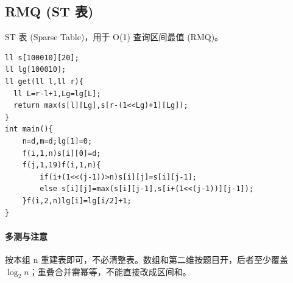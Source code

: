\subsection{RMQ (ST 表)}
ST 表 (Sparse Table)，用于 O(1) 查询区间最值 (RMQ)。
\begin{lstlisting}
ll s[100010][20];
ll lg[100010];
ll get(ll l,ll r){
  ll L=r-l+1,Lg=lg[L];
  return max(s[l][Lg],s[r-(1<<Lg)+1][Lg]);
}
int main(){
	n=d,m=d;lg[1]=0;
	f(i,1,n)s[i][0]=d;
	f(j,1,19)f(i,1,n){
		if(i+(1<<(j-1))>n)s[i][j]=s[i][j-1];
		else s[i][j]=max(s[i][j-1],s[i+(1<<(j-1))][j-1]);
	}f(i,2,n)lg[i]=lg[i/2]+1;
}
\end{lstlisting}

\paragraph{多测与注意} 按本组 n 重建表即可，不必清整表。数组和第二维按题目开，后者至少覆盖 $\log_2 n$；重叠合并需幂等，不能直接改成区间和。
